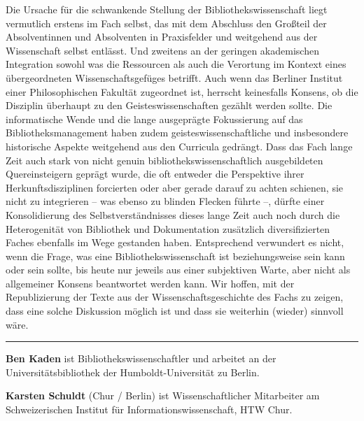 \documentclass[a4paper,
fontsize=11pt,
oneside,
numbers=noperiodatend,
parskip=half-,
bibliography=totoc,
final
]{scrartcl}
\begin{document}
Die Ursache für die schwankende Stellung der Bibliothekswissenschaft
liegt vermutlich erstens im Fach selbst, das mit dem Abschluss den
Großteil der Absolventinnen und Absolventen in Praxisfelder und
weitgehend aus der Wissenschaft selbst entlässt. Und zweitens an der
geringen akademischen Integration sowohl was die Ressourcen als auch die
Verortung im Kontext eines übergeordneten Wissenschaftsgefüges betrifft.
Auch wenn das Berliner Institut einer Philosophischen Fakultät
zugeordnet ist, herrscht keinesfalls Konsens, ob die Disziplin überhaupt
zu den Geisteswissenschaften gezählt werden sollte. Die informatische
Wende und die lange ausgeprägte Fokussierung auf das
Bibliotheksmanagement haben zudem geisteswissenschaftliche und
insbesondere historische Aspekte weitgehend aus den Curricula gedrängt.
Dass das Fach lange Zeit auch stark von nicht genuin
bibliothekswissenschaftlich ausgebildeten Quereinsteigern geprägt wurde,
die oft entweder die Perspektive ihrer Herkunftsdisziplinen forcierten
oder aber gerade darauf zu achten schienen, sie nicht zu integrieren --
was ebenso zu blinden Flecken führte --, dürfte einer Konsolidierung des
Selbstverständnisses dieses lange Zeit auch noch durch die Heterogenität
von Bibliothek und Dokumentation zusätzlich diversifizierten Faches
ebenfalls im Wege gestanden haben. Entsprechend verwundert es nicht,
wenn die Frage, was eine Bibliothekswissenschaft ist beziehungsweise
sein kann oder sein sollte, bis heute nur jeweils aus einer subjektiven
Warte, aber nicht als allgemeiner Konsens beantwortet werden kann. Wir
hoffen, mit der Republizierung der Texte aus der Wissenschaftsgeschichte
des Fachs zu zeigen, dass eine solche Diskussion möglich ist und dass
sie weiterhin (wieder) sinnvoll wäre.

\begin{center}\rule{0.5\linewidth}{\linethickness}\end{center}

\textbf{Ben Kaden} ist Bibliothekswissenschaftler und arbeitet an der
Universitätsbibliothek der Humboldt-Universität zu Berlin.

\textbf{Karsten Schuldt} (Chur / Berlin) ist Wissenschaftlicher
Mitarbeiter am Schweizerischen Institut für Informationswissenschaft,
HTW Chur.
\end{document}
